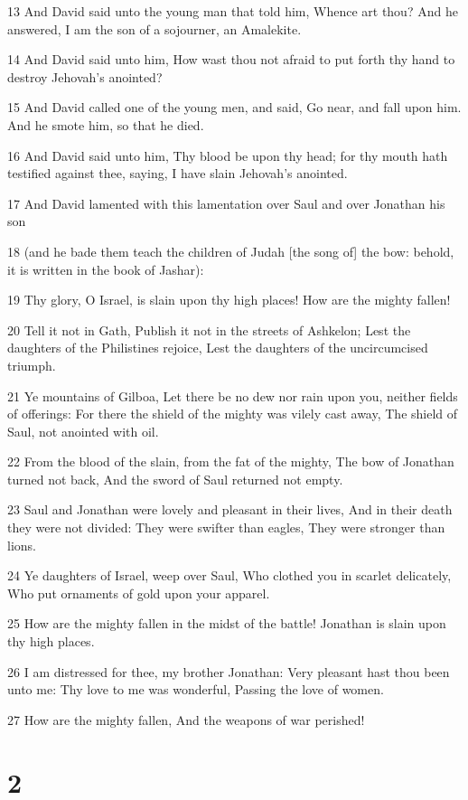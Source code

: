 \par 13 And David said unto the young man that told him, Whence art thou? And he answered, I am the son of a sojourner, an Amalekite.
\par 14 And David said unto him, How wast thou not afraid to put forth thy hand to destroy Jehovah's anointed?
\par 15 And David called one of the young men, and said, Go near, and fall upon him. And he smote him, so that he died.
\par 16 And David said unto him, Thy blood be upon thy head; for thy mouth hath testified against thee, saying, I have slain Jehovah's anointed.
\par 17 And David lamented with this lamentation over Saul and over Jonathan his son
\par 18 (and he bade them teach the children of Judah [the song of] the bow: behold, it is written in the book of Jashar):
\par 19 Thy glory, O Israel, is slain upon thy high places! How are the mighty fallen!
\par 20 Tell it not in Gath, Publish it not in the streets of Ashkelon; Lest the daughters of the Philistines rejoice, Lest the daughters of the uncircumcised triumph.
\par 21 Ye mountains of Gilboa, Let there be no dew nor rain upon you, neither fields of offerings: For there the shield of the mighty was vilely cast away, The shield of Saul, not anointed with oil.
\par 22 From the blood of the slain, from the fat of the mighty, The bow of Jonathan turned not back, And the sword of Saul returned not empty.
\par 23 Saul and Jonathan were lovely and pleasant in their lives, And in their death they were not divided: They were swifter than eagles, They were stronger than lions.
\par 24 Ye daughters of Israel, weep over Saul, Who clothed you in scarlet delicately, Who put ornaments of gold upon your apparel.
\par 25 How are the mighty fallen in the midst of the battle! Jonathan is slain upon thy high places.
\par 26 I am distressed for thee, my brother Jonathan: Very pleasant hast thou been unto me: Thy love to me was wonderful, Passing the love of women.
\par 27 How are the mighty fallen, And the weapons of war perished!

\chapter{2}

